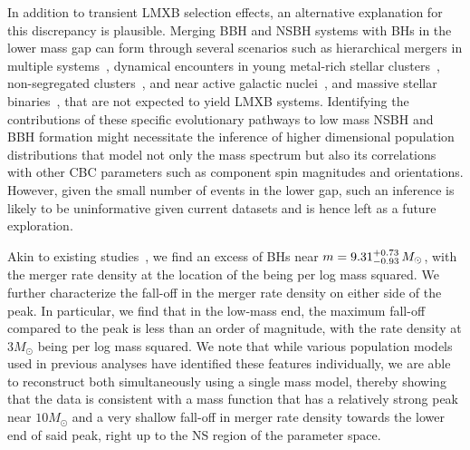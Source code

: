 \documentclass[modern]{aastex631}
\begin{document}
In addition to transient LMXB selection effects, an alternative explanation for this discrepancy is plausible. Merging BBH and NSBH systems with BHs in the lower mass gap can form through several scenarios such as hierarchical mergers in multiple systems~\citep{Lu:2020gfh, Liu:2020gif}, dynamical encounters in young metal-rich stellar clusters~\citep{ArcaSedda:2021zmm}, non-segregated clusters~\citep{Clausen:2014ksa, Fragione:2020wac, Rastello:2020sru}, and near active galactic nuclei~\citep{McKernan:2020lgr, Yang:2020xyi}, and massive stellar binaries~\citep{Antoniadis:2021dhe}, that are not expected to yield LMXB systems. Identifying the contributions of these specific evolutionary pathways to low mass NSBH and BBH formation might necessitate the inference of higher dimensional population distributions that model not only the mass spectrum but also its correlations with other CBC parameters such as component spin magnitudes and orientations. However, given the small number of events in the lower gap, such an inference is likely to be uninformative given current datasets and is hence left as a future exploration.

Akin to existing studies~\citep[e.g.,][]{KAGRA:2021duu, LIGOScientific:2024elc}, we find an excess
of BHs near $m=9.31^{+0.73}_{-0.93} \, M_\odot$, with the merger rate density at the location of the being \dNlogmpeakincludingnewunits per log mass squared. We further characterize the fall-off in the merger rate density on either side of the peak. In particular, we find that in the low-mass end, the maximum fall-off compared to the peak is less than an order of magnitude, with the rate density at $3M_{\odot}$ being \dNlogmmlowincludingnewunits per log mass squared. We note that while various population models used in previous analyses have identified these features individually,  we are able to reconstruct both simultaneously using a single mass model, thereby showing that the data is consistent with a mass function that has a relatively strong peak near $10M_{\odot}$ and a very shallow fall-off in merger rate density towards the lower end of said peak, right up to the NS region of the parameter space.
\end{document}
